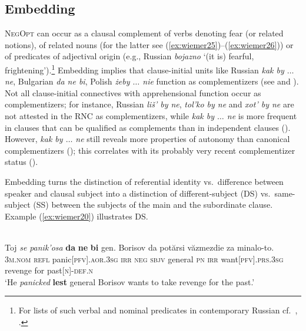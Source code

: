 \documentclass[output=paper,colorlinks,citecolor=brown]{langscibook}
\begin{document}
\subsection{Embedding}
\label{subsec:embedding}

\textsc{NegOpt} can occur as a clausal complement of verbs denoting fear (or related notions), of related nouns (for the latter see (\ref{ex:wiemer25})--(\ref{ex:wiemer26})) or of predicates of adjectival origin (e.g., Russian \textit{bojazno} `(it is) fearful, frightening').\footnote{For lists of such verbal and nominal predicates in contemporary Russian cf.\ \citet[56]{Nilsson2012}, \citet[338]{Dobrushina2016}.} Embedding implies that clause-initial units like Russian \textit{kak by $\ldots$ ne}, Bulgarian \textit{da ne bi}, Polish \textit{żeby $\ldots$  nie} function as complementizers (see  and ). Not all clause-initial connectives with apprehensional function occur as complementizers; for instance, Russian \textit{liš' by ne}, \textit{tol'ko by ne} and \textit{xot' by ne} are not attested in the RNC as complementizers, while \textit{kak by $\ldots$ ne} is more frequent in clauses that can be qualified as complements than in independent clauses (\citealt[335 and the Table on p. 330]{Dobrushina2016}). However, \textit{kak by $\ldots$  ne} still reveals more properties of autonomy than canonical complementizers (\citealt[345-346]{Dobrushina2016}); this correlates with its probably very recent complementizer status ().

Embedding turns the distinction of referential identity vs.\ difference between speaker and clausal subject into a distinction of different-subject (DS) vs.\ same-subject (SS) between the subjects of the main and the subordinate clause. Example (\ref{ex:wiemer20}) illustrates DS.


\ea
\label{ex:wiemer20} 
 \\
\gll Toj \textit{se} \textit{panik'osa} \textbf{da} \textbf{ne} \textbf{bi} gen. Borisov da potărsi văzmezdie za minalo-to. \\
\textsc{3m.nom} \textsc{refl} panic\textsc{[pfv].aor.3sg} \textsc{irr} \textsc{neg} \textsc{sbjv} general \textsc{pn} \textsc{irr} want\textsc{[pfv].prs.3sg} revenge for past\textsc{[n]-def.n} \\
\glt `He \textit{panicked} \textbf{lest} general Borisov wants to take revenge for the past.' \\
\z
\end{document}
